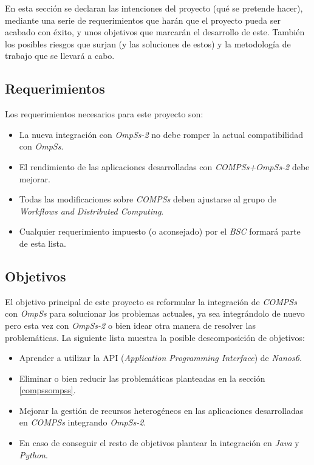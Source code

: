 En esta sección se declaran las intenciones del proyecto (qué se pretende hacer), mediante una serie de requerimientos que harán que el proyecto pueda ser acabado con éxito, y unos objetivos que marcarán el desarrollo de este. También los posibles riesgos que surjan (y las soluciones de estos) y la metodología de trabajo que se llevará a cabo.

\subsection{Requerimientos}

 Los requerimientos necesarios para este proyecto son:

\begin{itemize}
 \item La nueva integración con \textit{OmpSs-2} no debe romper la actual compatibilidad con \textit{OmpSs}.
 \item El rendimiento de las aplicaciones desarrolladas con \textit{COMPSs+OmpSs-2} debe mejorar.
 \item Todas las modificaciones sobre \textit{COMPSs} deben ajustarse al grupo de \textit{Workflows and Distributed Computing}.
 \item Cualquier requerimiento impuesto (o aconsejado) por el \textit{BSC} formará parte de esta lista.
  
\end{itemize}

\subsection{Objetivos}

El objetivo principal de este proyecto es reformular la integración de \textit{COMPSs} con \textit{OmpSs} para solucionar los problemas actuales, ya sea integrándolo de nuevo pero esta vez con \textit{OmpSs-2} o bien idear otra manera de resolver las problemáticas. La siguiente lista muestra la posible descomposición de objetivos:

\begin{itemize}
 \item Aprender a utilizar la API (\textit{Application Programming Interface}) de \textit{Nanos6}.
 \item Eliminar o bien reducir las problemáticas planteadas en la sección   \ref{compssompss}.
  \item Mejorar la gestión de recursos heterogéneos en las aplicaciones desarrolladas en \textit{COMPSs} integrando \textit{OmpSs-2}.
 \item En caso de conseguir el resto de objetivos plantear la integración en \textit{Java} y \textit{Python}.
\end{itemize}

